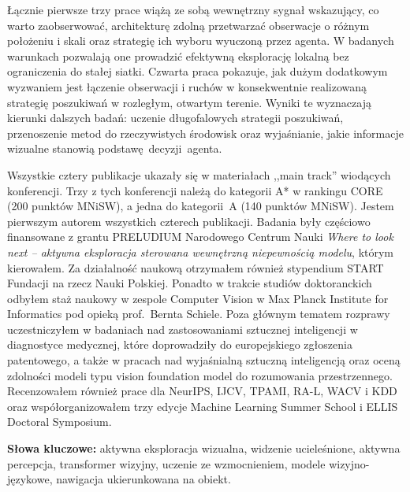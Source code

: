 \begin{polish}
Łącznie pierwsze trzy prace wiążą ze sobą wewnętrzny sygnał wskazujący, co warto zaobserwować, architekturę zdolną przetwarzać obserwacje o różnym położeniu i skali oraz strategię ich wyboru wyuczoną przez agenta. W badanych warunkach pozwalają one prowadzić efektywną eksplorację lokalną bez ograniczenia do stałej siatki. Czwarta praca pokazuje, jak dużym dodatkowym wyzwaniem jest łączenie obserwacji i ruchów w konsekwentnie realizowaną strategię poszukiwań w rozległym, otwartym terenie. Wyniki te wyznaczają kierunki dalszych badań: uczenie długofalowych strategii poszukiwań, przenoszenie metod do rzeczywistych środowisk oraz wyjaśnianie, jakie informacje wizualne stanowią podstawę~decyzji~agenta.

Wszystkie cztery publikacje ukazały się w materiałach ,,main track'' wiodących konferencji. Trzy z tych konferencji należą do kategorii A* w rankingu CORE (200 punktów MNiSW), a jedna do kategorii~A (140 punktów MNiSW). Jestem pierwszym autorem wszystkich czterech publikacji. Badania były częściowo finansowane z grantu PRELUDIUM Narodowego Centrum Nauki \emph{Where to look next -- aktywna eksploracja sterowana wewnętrzną niepewnością modelu}, którym kierowałem. Za działalność naukową otrzymałem również stypendium START Fundacji na rzecz Nauki Polskiej. Ponadto w trakcie studiów doktoranckich odbyłem staż naukowy w zespole Computer Vision w Max Planck Institute for Informatics pod opieką prof.\ Bernta Schiele. Poza głównym tematem rozprawy uczestniczyłem w badaniach nad zastosowaniami sztucznej inteligencji w diagnostyce medycznej, które doprowadziły do europejskiego zgłoszenia patentowego, a także w pracach nad wyjaśnialną sztuczną inteligencją oraz oceną zdolności modeli typu vision foundation model do rozumowania przestrzennego. Recenzowałem również prace dla NeurIPS, IJCV, TPAMI, RA-L, WACV i KDD oraz współorganizowałem trzy edycje Machine Learning Summer School i ELLIS Doctoral Symposium.

\vspace{1em}
\noindent\textbf{Słowa kluczowe:} aktywna eksploracja wizualna, widzenie ucieleśnione, aktywna percepcja, transformer wizyjny, uczenie ze wzmocnieniem, modele wizyjno-językowe, nawigacja ukierunkowana na obiekt.

\end{polish}
